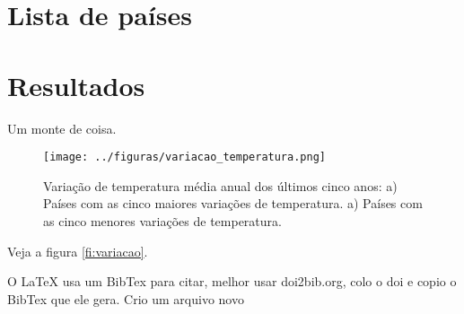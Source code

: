 \documentclass{article}
\begin{document}
\section{Lista de países}

\Paises
\section{Resultados}

Um monte de coisa.

\begin{figure}[tb!] 
	\centering
	\texttt{[image: ../figuras/variacao\_temperatura.png]}
	\caption{
	Variação de temperatura média anual dos últimos cinco anos:
	a) Países com as cinco maiores variações de temperatura.
	a) Países com as cinco menores variações de temperatura.
	}
	\label{fig:variacao}
\end{figure}

Veja a figura \ref{fi:variacao}.


O LaTeX usa um BibTex para citar, melhor usar doi2bib.org, colo o doi e copio o 
BibTex que ele gera.
Crio um arquivo novo




\end{document}
